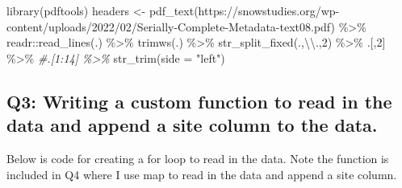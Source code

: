 \documentclass[
]{book}
\newenvironment{Shaded}{\begin{snugshade}}{\end{snugshade}}
\newcommand{\AttributeTok}[1]{\textcolor[rgb]{0.77,0.63,0.00}{#1}}
\newcommand{\CommentTok}[1]{\textcolor[rgb]{0.56,0.35,0.01}{\textit{#1}}}
\newcommand{\DecValTok}[1]{\textcolor[rgb]{0.00,0.00,0.81}{#1}}
\newcommand{\FunctionTok}[1]{\textcolor[rgb]{0.00,0.00,0.00}{#1}}
\newcommand{\NormalTok}[1]{#1}
\newcommand{\OtherTok}[1]{\textcolor[rgb]{0.56,0.35,0.01}{#1}}
\newcommand{\SpecialCharTok}[1]{\textcolor[rgb]{0.00,0.00,0.00}{#1}}
\newcommand{\StringTok}[1]{\textcolor[rgb]{0.31,0.60,0.02}{#1}}
\begin{document}
\begin{Shaded}
\begin{Highlighting}[]
\FunctionTok{library}\NormalTok{(pdftools)}
\NormalTok{headers }\OtherTok{\textless{}{-}} \FunctionTok{pdf\_text}\NormalTok{(}\StringTok{\textquotesingle{}https://snowstudies.org/wp{-}content/uploads/2022/02/Serially{-}Complete{-}Metadata{-}text08.pdf\textquotesingle{}}\NormalTok{) }\SpecialCharTok{\%\textgreater{}\%}
\NormalTok{  readr}\SpecialCharTok{::}\FunctionTok{read\_lines}\NormalTok{(.) }\SpecialCharTok{\%\textgreater{}\%}
  \FunctionTok{trimws}\NormalTok{(.) }\SpecialCharTok{\%\textgreater{}\%}
  \FunctionTok{str\_split\_fixed}\NormalTok{(.,}\StringTok{\textquotesingle{}}\SpecialCharTok{\textbackslash{}\textbackslash{}}\StringTok{.\textquotesingle{}}\NormalTok{,}\DecValTok{2}\NormalTok{) }\SpecialCharTok{\%\textgreater{}\%}
\NormalTok{  .[,}\DecValTok{2}\NormalTok{] }\SpecialCharTok{\%\textgreater{}\%}
  \CommentTok{\#.[1:14] \%\textgreater{}\%}
  \FunctionTok{str\_trim}\NormalTok{(}\AttributeTok{side =} \StringTok{"left"}\NormalTok{)}
\end{Highlighting}
\end{Shaded}

\hypertarget{q3-writing-a-custom-function-to-read-in-the-data-and-append-a-site-column-to-the-data.}{%
\subsection{Q3: Writing a custom function to read in the data and append a site column to the data.}\label{q3-writing-a-custom-function-to-read-in-the-data-and-append-a-site-column-to-the-data.}}

Below is code for creating a for loop to read in the data. Note the function is included in Q4 where I use map to read in the data and append a site column.
\end{document}
